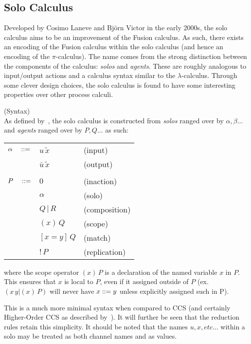\subsection{Solo Calculus}
    
    Developed by Cosimo Laneve and Bj{\"o}rn Victor in the early 2000s, the solo calculus aims to be an improvement of the Fusion calculus.
    As such, there exists an encoding of the Fusion calculus within the solo calculus (and hence an encoding of the $\pi$-calculus).
    The name comes from the strong distinction between the components of the calculus: \textit{solos} and \textit{agents}.
    These are roughly analogous to input/output actions and a calculus syntax similar to the $\lambda$-calculus.
    Through some clever design choices, the solo calculus is found to have some interesting properties over other process calculi.

    \begin{definition}{(Syntax)\\}
        \label{solo-calculus-syntax}
        As defined by~\cite{solo-calculus}, the solo calculus is constructed from \textit{solos} ranged over by $\alpha, \beta \ldots$ and \textit{agents} ranged over by $P, Q \ldots$ as such:
        \begin{center}
            \begin{tabular}{ l l l }
                $\alpha \quad ::=$   & $u \, \tilde{x}$          & (input) \\
                                        & $\bar{u} \, \tilde{x}$    & (output)~\footnotemark\\ \\
                $P \quad ::=$        & $0$                       & (inaction) \\
                                        & $\alpha$                  & (solo) \\
                                        & $Q \, | \, R$             & (composition) \\
                                        & $(x) \, Q$                & (scope) \\
                                        & $[x=y] \, Q$              & (match) \\
                                        & $!\,P$                    & (replication)
            \end{tabular}
        \end{center}
        where the scope operator $(x) \, P $ is a declaration of the named variable $x$ in $P$.
        This ensures that $x$ is local to $P$, even if it assigned outside of $P$ (ex. $(x \, y | (x) \, P)$ will never have $x ::= y$ unless explicitly assigned such in P).
    \end{definition}
    This is a much more minimal syntax when compared to CCS (and certainly Higher-Order CCS as described by~\cite{pi-calculus-in-ccs}).
    It will further be seen that the reduction rules retain this simplicity.
    It should be noted that the names $u, x, etc\ldots$ within a solo may be treated as both channel names and as values.


